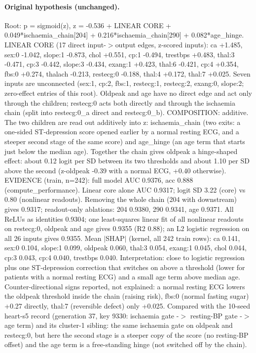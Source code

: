 \documentclass[a4paper,10pt]{article}
\newif\ifreviewmarks
\newcommand{\reviewrule}{\noindent{\color{BrickRed}\rule{\linewidth}{0.8pt}}}
\newenvironment{drafted}[1][]{%
  \ifreviewmarks\par\addvspace{\medskipamount}\reviewrule\par\nopagebreak
  \noindent{\color{BrickRed}\sffamily\footnotesize\textbf{Thesis Draft}\quad #1\hfill review}\par\nopagebreak\smallskip\fi}{%
  \ifreviewmarks\par\smallskip\noindent{\color{BrickRed}\sffamily\footnotesize end of thesis draft}\par\nopagebreak\reviewrule\par\medskip\fi}
\begin{document}
\begin{drafted}[plain-language layer: heart-s5-c3]
\paragraph{Original hypothesis (unchanged).} Root: p = sigmoid(z), z = -0.536 + LINEAR CORE + 0.049*\allowbreak{}ischaemia\_\allowbreak{}chain[204]\allowbreak{} + 0.216*\allowbreak{}ischaemia\_\allowbreak{}chain[290]\allowbreak{} + 0.082*age\_\allowbreak{}hinge. LINEAR CORE (17 direct input-$>$output edges, z-scored inputs): ca +1.485, sex:0 -1.042, slope:1 -0.873, chol +0.551, cp:1 -0.494, trestbps +0.483, thal:3 -0.471, cp:3 -0.442, slope:3 -0.434, exang:1 +0.423, thal:6 -0.421, cp:4 +0.354, fbs:0 +0.274, thalach -0.213, restecg:0 -0.188, thal:4 +0.172, thal:7 +0.025. Seven inputs are unconnected (sex:1, cp:2, fbs:1, restecg:1, restecg:2, exang:0, slope:2; zero-effect entries of this root). Oldpeak and age have no direct edge and act only through the children; restecg:0 acts both directly and through the ischaemia chain (split into restecg:0\_\allowbreak{}a direct and restecg:0\_\allowbreak{}b). COMPOSITION: additive. The two children are read out additively into z: ischaemia\_\allowbreak{}chain (two exits: a one-sided ST-depression score opened earlier by a normal resting ECG, and a steeper second stage of the same score) and age\_\allowbreak{}hinge (an age term that starts just below the median age). Together the chain gives oldpeak a hinge-shaped effect: about 0.12 logit per SD between its two thresholds and about 1.10 per SD above the second (z-oldpeak -0.39 with a normal ECG, +0.40 otherwise). EVIDENCE (train, n=242): full model AUC 0.9376, acc 0.888 (compute\_\allowbreak{}performance)\allowbreak{}. Linear core alone AUC 0.9317; logit SD 3.22 (core) vs 0.80 (nonlinear readouts). Removing the whole chain (204 with downstream) gives 0.9317; readout-only ablations: 204 0.9380, 290 0.9341, age 0.9371. All ReLUs as identities 0.9304; one least-squares linear fit of all nonlinear readouts on restecg:0, oldpeak and age gives 0.9355 (R2 0.88); an L2 logistic regression on all 26 inputs gives 0.9355. Mean $|$SHAP$|$ (kernel, all 242 train rows): ca 0.141, sex:0 0.104, slope:1 0.099, oldpeak 0.060, thal:3 0.054, exang:1 0.045, chol 0.044, cp:3 0.043, cp:4 0.040, trestbps 0.040. Interpretation: close to logistic regression plus one ST-depression correction that switches on above a threshold (lower for patients with a normal resting ECG) and a small age term above median age. Counter-directional signs reported, not explained: a normal resting ECG lowers the oldpeak threshold inside the chain (raising risk), fbs:0 (normal fasting sugar) +0.27 directly, thal:7 (reversible defect) only +0.025. Compared with the 10-seed heart-s5 record (generation 37, key 9330: ischaemia gate -$>$ resting-BP gate -$>$ age term) and its cluster-1 sibling: the same ischaemia gate on oldpeak and restecg:0, but here the second stage is a steeper copy of the score (no resting-BP offset) and the age term is a free-standing hinge (not switched off by the chain).

\end{drafted}
\end{document}

